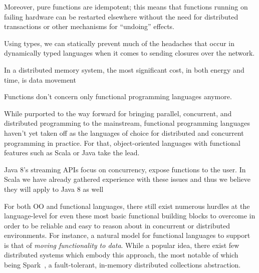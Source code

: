 \documentclass{llncs}
\begin{document}
\begin{fquote}Moreover, pure functions are idempotent; this means that functions running on failing hardware can be restarted elsewhere without the need for distributed transactions or other mechanisms for “undoing” effects.
 \end{fquote}

Using types, we can statically prevent much of the headaches that occur in dynamically typed languages when it comes to sending closures over the network.

\begin{fquote}In a distributed memory system, the most significant cost, in both energy
and time, is data movement
 \end{fquote}


Functions don't concern only functional programming languages anymore.


While purported to the way forward for bringing parallel, concurrent, and
distributed programming to the mainstream, functional programming languages
haven't yet taken off as the languages of choice for distributed and
concurrent programming in practice. For that, object-oriented languages with functional features such as Scala or Java take the lead. 

Java 8's streaming APIs focus on concurrency, expose functions to the user.
In Scala we have already gathered experience with these issues and thus we
believe they will apply to Java 8 as well

For both OO and functional languages, there still exist numerous hurdles at
the language-level for even these most basic functional building blocks to
overcome in order to be reliable and easy to reason about in concurrent or
distributed environments. For instance, a natural model for
functional languages to support is that of {\em moving functionality to
data}. While a popular idea, there exist few distributed systems which embody
this approach, the most notable of which being Spark~\cite{Spark}, a fault-tolerant, 
in-memory distributed collections abstraction.
\end{document}
